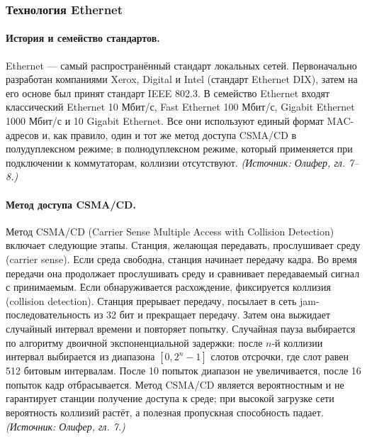 \documentclass[a4paper,12pt]{article}
\begin{document}
\subsubsection{Технология Ethernet}

\paragraph{История и семейство стандартов.}
Ethernet — самый распространённый стандарт локальных сетей. Первоначально разработан компаниями Xerox, Digital и Intel (стандарт Ethernet DIX), затем на его основе был принят стандарт IEEE 802.3. В семейство Ethernet входят классический Ethernet 10 Мбит/с, Fast Ethernet 100 Мбит/с, Gigabit Ethernet 1000 Мбит/с и 10 Gigabit Ethernet. Все они используют единый формат MAC-адресов и, как правило, один и тот же метод доступа CSMA/CD в полудуплексном режиме; в полнодуплексном режиме, который применяется при подключении к коммутаторам, коллизии отсутствуют.
\textit{(Источник: Олифер, гл. 7–8.)}

\paragraph{Метод доступа CSMA/CD.}
Метод CSMA/CD (Carrier Sense Multiple Access with Collision Detection) включает следующие этапы. Станция, желающая передавать, прослушивает среду (carrier sense). Если среда свободна, станция начинает передачу кадра. Во время передачи она продолжает прослушивать среду и сравнивает передаваемый сигнал с принимаемым. Если обнаруживается расхождение, фиксируется коллизия (collision detection). Станция прерывает передачу, посылает в сеть jam-последовательность из 32 бит и прекращает передачу. Затем она выжидает случайный интервал времени и повторяет попытку. Случайная пауза выбирается по алгоритму двоичной экспоненциальной задержки: после \(n\)-й коллизии интервал выбирается из диапазона \([0, 2^n-1]\) слотов отсрочки, где слот равен 512 битовым интервалам. После 10 попыток диапазон не увеличивается, после 16 попыток кадр отбрасывается. Метод CSMA/CD является вероятностным и не гарантирует станции получение доступа к среде; при высокой загрузке сети вероятность коллизий растёт, а полезная пропускная способность падает.
\textit{(Источник: Олифер, гл. 7.)}
\end{document}
